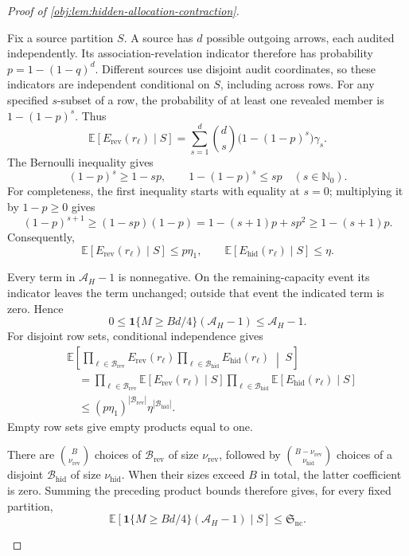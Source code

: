 \begin{proof}[Proof of \cref{obj:lem:hidden-allocation-contraction}]
\begin{enumerate}
Fix a source partition \(S\). A source has \(d\) possible outgoing arrows, each audited independently. Its association-revelation indicator therefore has probability \(p=1-(1-q)^d\). Different sources use disjoint audit coordinates, so these indicators are independent conditional on \(S\), including across rows. For any specified \(s\)-subset of a row, the probability of at least one revealed member is \(1-(1-p)^s\). Thus
\[
\mathbb E\!\left[E_{\mathrm{rev}}(r_\ell)\mid S\right]
=
\sum_{s=1}^d
\binom ds\bigl(1-(1-p)^s\bigr)\gamma_s.
\]
The Bernoulli inequality gives
\[
(1-p)^s\ge1-sp,
\qquad
1-(1-p)^s\le sp
\quad(s\in\mathbb N_0).
\]
For completeness, the first inequality starts with equality at \(s=0\); multiplying it by \(1-p\ge0\) gives
\[
(1-p)^{s+1}
\ge(1-sp)(1-p)
=1-(s+1)p+sp^2
\ge1-(s+1)p.
\]
Consequently,
\[
\mathbb E\!\left[E_{\mathrm{rev}}(r_\ell)\mid S\right]
\le p\eta_1,
\qquad
\mathbb E\!\left[E_{\mathrm{hid}}(r_\ell)\mid S\right]
\le\eta.
\]

Every term in \(\mathcal A_H-1\) is nonnegative. On the remaining-capacity event its indicator leaves the term unchanged; outside that event the indicated term is zero. Hence
\[
0\le
\mathbf1\{M\ge Bd/4\}(\mathcal A_H-1)
\le\mathcal A_H-1.
\]
For disjoint row sets, conditional independence gives
\[
\begin{aligned}
&\mathbb E\!\left[
\prod_{\ell\in\mathcal B_{\mathrm{rev}}}E_{\mathrm{rev}}(r_\ell)
\prod_{\ell\in\mathcal B_{\mathrm{hid}}}E_{\mathrm{hid}}(r_\ell)
\;\middle|\;S
\right]
\\
&\quad=
\prod_{\ell\in\mathcal B_{\mathrm{rev}}}
\mathbb E[E_{\mathrm{rev}}(r_\ell)\mid S]
\prod_{\ell\in\mathcal B_{\mathrm{hid}}}
\mathbb E[E_{\mathrm{hid}}(r_\ell)\mid S]
\\
&\quad\le
(p\eta_1)^{|\mathcal B_{\mathrm{rev}}|}
\eta^{|\mathcal B_{\mathrm{hid}}|}.
\end{aligned}
\]
Empty row sets give empty products equal to one.

There are
\(\binom B{\nu_{\mathrm{rev}}}\) choices of
\(\mathcal B_{\mathrm{rev}}\) of size \(\nu_{\mathrm{rev}}\), followed by
\(\binom{B-\nu_{\mathrm{rev}}}{\nu_{\mathrm{hid}}}\) choices of a disjoint
\(\mathcal B_{\mathrm{hid}}\) of size \(\nu_{\mathrm{hid}}\).
When their sizes exceed \(B\) in total, the latter coefficient is zero.
Summing the preceding product bounds therefore gives, for every fixed partition,
\[
\mathbb E\!\left[
\mathbf1\{M\ge Bd/4\}(\mathcal A_H-1)
\mid S
\right]
\le\mathfrak S_{\mathrm{nc}}.
\]


\end{enumerate}
\end{proof}
